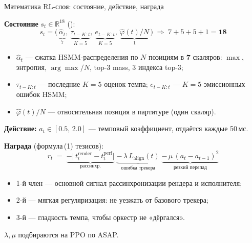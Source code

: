 \begin{frame}{Математика RL-слоя: состояние, действие, награда}
  \footnotesize\setlength{\abovedisplayskip}{3pt}
  \setlength{\belowdisplayskip}{3pt}

  \textbf{Состояние} $s_t \in \mathbb{R}^{18}$ ():
  \[
    s_t = \bigl(\,\underbrace{\hat\alpha_t}_{7},\
                  \underbrace{\tau_{t-K:t}}_{K=5},\
                  \underbrace{e_{t-K:t}}_{K=5},\
                  \underbrace{\hat\varphi(t)/N}_{1}\,\bigr)
    \;\Rightarrow\; 7+5+5+1 = \mathbf{18}
  \]
  \begin{itemize}\setlength{\itemsep}{0.15em}
    \item $\hat\alpha_t$ --- сжатка HSMM-распределения по $N$ позициям
          в \textbf{7} скаляров: $\max$, энтропия, $\arg\max/N$,
          top-3 mass, 3 индекса top-3;
    \item $\tau_{t-K:t}$ --- последние $K{=}5$ оценок темпа;\quad
          $e_{t-K:t}$ --- $K{=}5$ эмиссионных ошибок HSMM;
    \item $\hat\varphi(t)/N$ --- относительная позиция в партитуре
          (один скаляр).
  \end{itemize}

  \textbf{Действие:} $a_t \in [0.5,\, 2.0]$ --- темповый коэффициент,
  отдаётся каждые 50\,мс.

  \vspace{0.3em}
  \textbf{Награда} (формула\,(1) тезисов):
  \[
    r_t \;=\;
      \underbrace{-\bigl|\,t^{\text{render}}_t - t^{\text{perf}}_t\bigr|}_{\text{рассинхр.}}
      \;
      \underbrace{-\,\lambda\,L_{\text{align}}(t)}_{\text{ошибка трекера}}
      \;
      \underbrace{-\,\mu\,(a_t - a_{t-1})^{2}}_{\text{резкий перепад}}
  \]
  \begin{itemize}\setlength{\itemsep}{0.15em}
    \item 1-й член --- основной сигнал рассинхронизации рендера и исполнителя;
    \item 2-й --- мягкая регуляризация: не уезжать от базового трекера;
    \item 3-й --- гладкость темпа, чтобы оркестр не «дёргался».
  \end{itemize}
  $\lambda, \mu$ подбираются на PPO по ASAP.
\end{frame}

